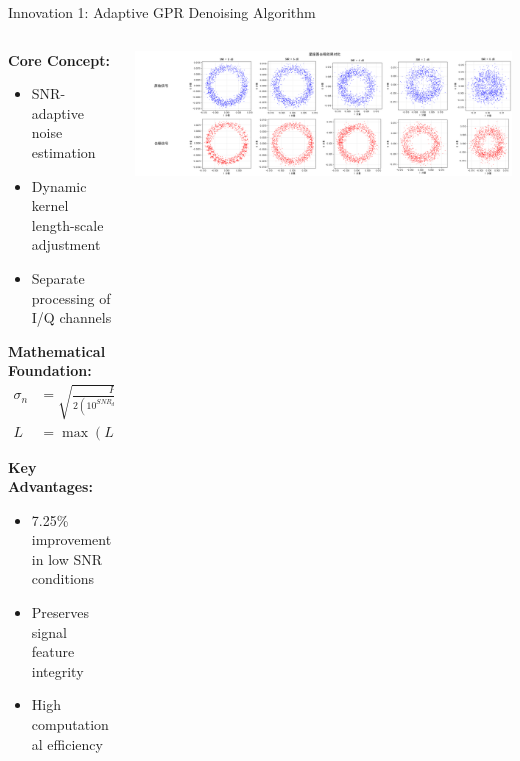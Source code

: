 \documentclass[aspectratio=169]{beamer}
\begin{document}
\begin{frame}{Innovation 1: Adaptive GPR Denoising Algorithm}
\begin{columns}
\begin{column}{0.6\textwidth}
\textbf{Core Concept:}
\begin{itemize}
\item SNR-adaptive noise estimation
\item Dynamic kernel length-scale adjustment
\item Separate processing of I/Q channels
\end{itemize}

\textbf{Mathematical Foundation:}
\begin{align}
\sigma_n &= \sqrt{\frac{P_r}{2(10^{SNR_{dB}/10}+1)}} \\
L &= \max(L_{min}, L_0(1+SNR/20))
\end{align}

\textbf{Key Advantages:}
\begin{itemize}
\item 7.25\% improvement in low SNR conditions
\item Preserves signal feature integrity
\item High computational efficiency
\end{itemize}
\end{column}
\begin{column}{0.4\textwidth}
\includegraphics[width=\textwidth]{../paper/figure/constellation_denoising.png}
\end{column}
\end{columns}
\end{frame}
\end{document}
